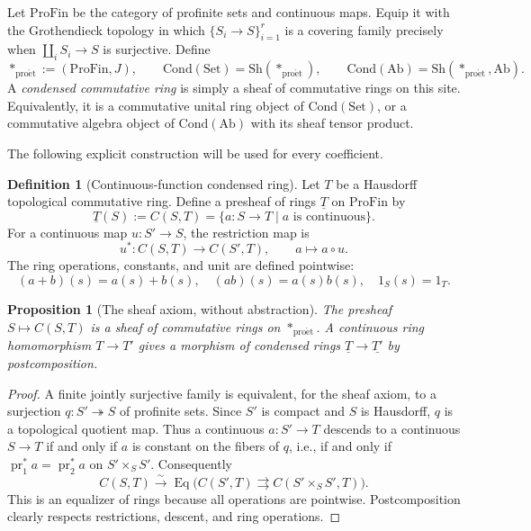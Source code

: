 \documentclass[11pt,a4paper]{article}
\numberwithin{equation}{section}
\newtheorem{proposition}[theorem]{Proposition}
\theoremstyle{definition}
\newtheorem{definition}[theorem]{Definition}
\theoremstyle{remark}
\newcommand{\ProFin}{\mathrm{ProFin}}
\newcommand{\Cond}{\mathrm{Cond}}
\newcommand{\Sh}{\mathrm{Sh}}
\newcommand{\proet}{\mathrm{pro\acute{e}t}}
\newcommand{\ringunder}[1]{\underline{#1}}
\begin{document}
Let $\ProFin$ be the category of profinite sets and continuous maps.
Equip it with the Grothendieck topology in which
$\{S_i\to S\}_{i=1}^r$ is a covering family precisely when
$\coprod_i S_i\to S$ is surjective.  Define
\[
    *_{\proet}:=(\ProFin,J),\qquad
    \Cond(\mathrm{Set})=\Sh(*_{\proet}),\qquad
    \Cond(\mathrm{Ab})=\Sh(*_{\proet},\mathrm{Ab}).
\]
A \emph{condensed commutative ring} is simply a sheaf of commutative rings
on this site.  Equivalently, it is a commutative unital ring object of
$\Cond(\mathrm{Set})$, or a commutative algebra object of
$\Cond(\mathrm{Ab})$ with its sheaf tensor product.

The following explicit construction will be used for every coefficient.

\begin{definition}[Continuous-function condensed ring]\label{def:cond-T}
Let $T$ be a Hausdorff topological commutative ring.  Define a presheaf
of rings $\ringunder T$ on $\ProFin$ by
\begin{equation}\label{eq:point-sections}
      \boxed{\quad \ringunder T(S):=C(S,T)
       =\{a:S\to T\mid a\text{ is continuous}\}.\quad}
\end{equation}
For a continuous map $u:S'\to S$, the restriction map is
\[
      u^*:C(S,T)\longrightarrow C(S',T),\qquad a\longmapsto a\circ u.
\]
The ring operations, constants, and unit are defined pointwise:
\[
(a+b)(s)=a(s)+b(s),\quad
(ab)(s)=a(s)b(s),\quad 1_S(s)=1_T.
\]
\end{definition}

\begin{proposition}[The sheaf axiom, without abstraction]\label{prop:sheaf}
The presheaf $S\mapsto C(S,T)$ is a sheaf of commutative rings on
$*_{\proet}$.  A continuous ring homomorphism $T\to T'$ gives a morphism
of condensed rings $\ringunder T\to\ringunder{T'}$ by postcomposition.
\end{proposition}
\begin{proof}
A finite jointly surjective family is equivalent, for the sheaf axiom, to
a surjection $q:S'\twoheadrightarrow S$ of profinite sets.  Since $S'$ is
compact and $S$ is Hausdorff, $q$ is a topological quotient map.  Thus a
continuous $a:S'\to T$ descends to a continuous $S\to T$ if and only if
$a$ is constant on the fibers of $q$, i.e., if and only if
$\operatorname{pr}_1^*a=\operatorname{pr}_2^*a$ on $S'\times_S S'$.
Consequently
\[
 C(S,T)\xrightarrow{\sim}
 \operatorname{Eq}\bigl(
 C(S',T)\rightrightarrows C(S'\times_S S',T)\bigr).
\]
This is an equalizer of rings because all operations are pointwise.
Postcomposition clearly respects restrictions, descent, and ring operations.
\end{proof}
\end{document}
